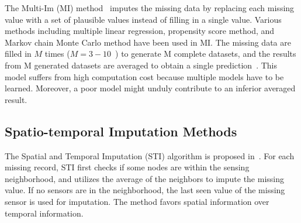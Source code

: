 The Multi-Im (MI) method~\cite{yuan2000multiple} imputes the missing data by replacing each missing value with a set of plausible values instead of filling in a single value. Various methods including multiple linear regression, propensity score method, and Markov chain Monte Carlo method have been used in MI. The missing data are filled in $M$ times ($M=3-10$~\cite{Little:hotdeck}) 
to generate M complete datasets, and the results from M generated datasets are averaged to obtain a single prediction~\cite{yuan2000multiple}. 
This model suffers from high computation cost because multiple models have to be learned. Moreover, a poor model might unduly 
contribute to an inferior averaged result. 



\subsection{Spatio-temporal Imputation Methods}



The Spatial and Temporal Imputation (STI) algorithm is proposed in~\cite{li2008spatial}. 
For each missing record, STI first checks if some nodes are within the sensing neighborhood, and utilizes
the average of the neighbors to impute the missing value. If no sensors are in the neighborhood, the last seen value of the 
missing sensor is used for imputation. The method favors spatial information over temporal information.

